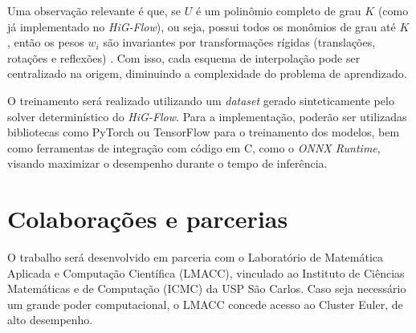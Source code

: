 \documentclass[
	12pt,				%
	oneside,			%
	a4paper,			%
	english,			%
	brazilian,				%
	]{article}
\begin{document}
	Uma observação relevante é que, se $U$ é um polinômio completo de grau $K$ (como já implementado no \textit{HiG-Flow}), ou seja, possui todos os monômios de grau até $K$, então os pesos $w_i$ são invariantes por transformações rígidas (translações, rotações e reflexões) \cite{Sousa2019}. Com isso, cada esquema de interpolação pode ser centralizado na origem, diminuindo a complexidade do problema de aprendizado.
	
	O treinamento será realizado utilizando um \textit{dataset} gerado sinteticamente pelo solver determinístico do \textit{HiG-Flow}. Para a implementação, poderão ser utilizadas bibliotecas como PyTorch ou TensorFlow para o treinamento dos modelos, bem como ferramentas de integração com código em C, como o \textit{ONNX Runtime}, visando maximizar o desempenho durante o tempo de inferência.

	

	
	\section{Colaborações e parcerias}

	O trabalho será desenvolvido em parceria com o Laboratório de Matemática Aplicada e Computação Científica (LMACC), vinculado ao Instituto de Ciências Matemáticas e de Computação (ICMC) da USP São Carlos. Caso seja necessário um grande poder computacional, o LMACC concede acesso ao Cluster Euler, de alto desempenho.

	\printbibliography
\end{document}
